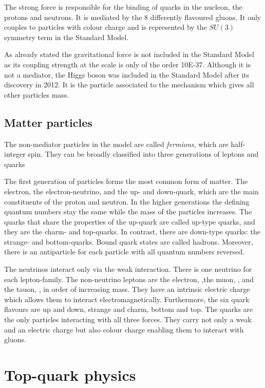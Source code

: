 The strong force is responsible for the binding of quarks in the nucleon, the protons and neutrons. It is mediated by the \num{8} differently flavoured gluons. It only couples to particles with colour charge and is represented by the $SU(3)$ symmetry term in the Standard Model.

As already stated the gravitational force is not included in the Standard Model as its coupling strength at the scale is only of the order \num{10E-37}. Although it is not a mediator, the Higgs boson was included in the Standard Model after its discovery in 2012. It is the particle associated to the mechanism which gives all other particles mass.

\subsection{Matter particles}

The non-mediator particles in the model are called \emph{fermions}, which are half-integer spin. They can be broadly classified into three generations of leptons and quarks

The first generation of particles forms the most common form of matter. The electron, the electron-neutrino, and the up- and down-quark, which are the main constituents of the proton and neutron.
In the higher generations the defining quantum numbers stay the same while the mass of the particles increases.
The quarks that share the properties of the up-quark are called up-type quarks, and they are the charm- and top-quarks. In contrast, there are down-type quarks: the strange- and bottom-quarks. Bound quark states are called hadrons.
Moreover, there is an antiparticle for each particle with all quantum numbers reversed.

The neutrinos interact only via the weak interaction. There is one neutrino for each lepton-family.
The non-neutrino leptons are the electron, \Pelectron,the muon, \Pmu , and the tauon, \Ptau, in order of increasing mass. They have an intrinsic electric charge which allows them to interact electromagnetically.
Furthermore, the six quark flavours are up and down, strange and charm, bottom and top.
The quarks are the only particles interacting with all three forces. They carry not only a weak and an electric charge but also colour charge enabling them to interact with gluons.

\section{Top-quark physics}


